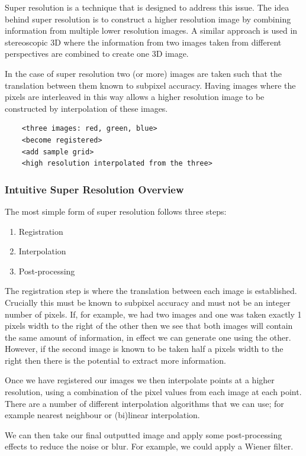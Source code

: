 \documentclass[
  oneside,
  11pt, a4paper,
  footinclude=true,
  headinclude=true,
  cleardoublepage=empty
]{scrbook}
\begin{document}
Super resolution is a technique that is designed to address this issue. The idea behind super resolution is to construct a higher resolution image by combining information from multiple lower resolution images. A similar approach is used in stereoscopic 3D where the information from two images taken from different perspectives are combined to create one 3D image.

In the case of super resolution two (or more) images are taken such that the translation between them known to subpixel accuracy. Having images where the pixels are interleaved in this way allows a higher resolution image to be constructed by interpolation of these images.

\begin{verbatim}
	<three images: red, green, blue>
	<become registered>
	<add sample grid>
	<high resolution interpolated from the three>
\end{verbatim}

\subsubsection*{Intuitive Super Resolution Overview}
The most simple form of super resolution follows three steps:

\begin{enumerate}
	\item Registration
	\item Interpolation
	\item Post-processing
\end{enumerate}

The registration step is where the translation between each image is established. Crucially this must be known to subpixel accuracy and must not be an integer number of pixels. If, for example, we had two images and one was taken exactly 1 pixels width to the right of the other then we see that both images will contain the same amount of information, in effect we can generate one using the other. However, if the second image is known to be taken half a pixels width to the right then there is the potential to extract more information.

Once we have registered our images we then interpolate points at a higher resolution, using a combination of the pixel values from each image at each point. There are a number of different interpolation algorithms that we can use; for example nearest neighbour or (bi)linear interpolation.

We can then take our final outputted image and apply some post-processing effects to reduce the noise or blur. For example, we could apply a Wiener filter\cite{wienerfilter}.
\end{document}
